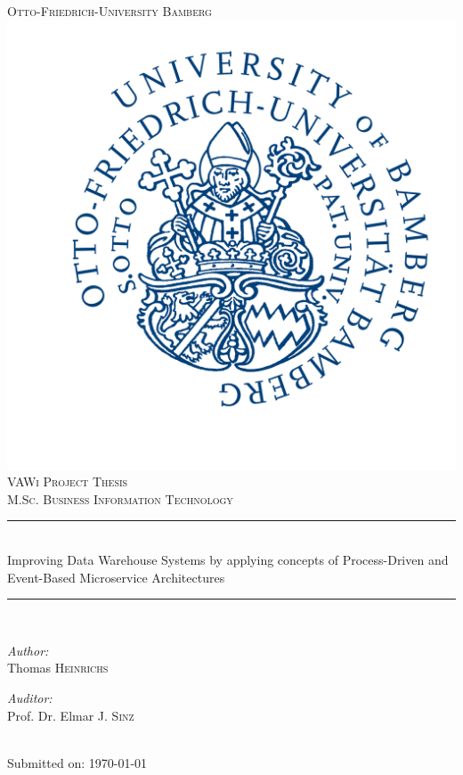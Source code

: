 
\begin{titlepage}
\newcommand{\HRule}{\rule{\linewidth}{0.5mm}} 
\center
\textsc{\LARGE Otto-Friedrich-University Bamberg}\\[1.5cm] 
\includegraphics[scale=0.1]{Logos/Otto-Friedrich-Universitaet_Bamberg_logo.png}\\
\textsc{\Large VAWi Project Thesis}\\[0.8cm] 
\textsc{\large M.Sc. Business Information Technology}\\[0.5cm]
\HRule \\[0.4cm]
{\Large Improving Data Warehouse Systems by applying concepts of Process-Driven and Event-Based Microservice Architectures}
\HRule \\[1cm]
\begin{minipage}{0.4\textwidth}
\begin{flushleft} \large
\emph{Author:}\\
Thomas\textsc{ Heinrichs}\\
\end{flushleft}
\end{minipage}
\begin{minipage}{0.4\textwidth}
\begin{flushright} \large
\emph{Auditor:} \\
Prof. Dr. Elmar J. \textsc{Sinz}\\
\end{flushright}
\end{minipage}\\[2cm]
{Submitted on: \large \today}\\[1.4cm] 
\vfill
\end{titlepage}